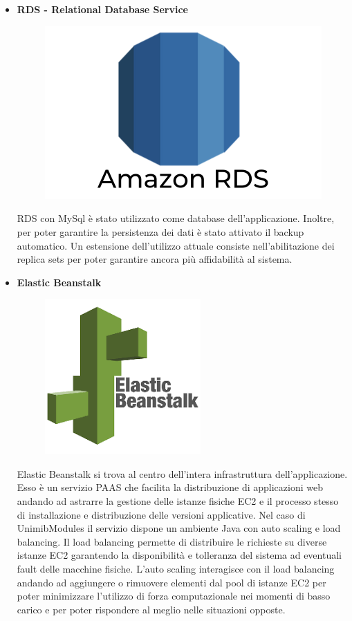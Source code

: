 \documentclass[12pt]{article}
\begin{document}
\begin{itemize}
\item \textbf{RDS - Relational Database Service}
\begin{figure}[H]
\includegraphics[scale=0.1, left]{rds.png}
\end{figure}
RDS con MySql è stato utilizzato come database dell'applicazione. Inoltre, per poter garantire la persistenza dei dati è stato attivato il backup automatico. Un estensione dell'utilizzo attuale consiste nell'abilitazione dei replica sets per poter garantire ancora più affidabilità al sistema.
\item \textbf{Elastic Beanstalk}
\begin{figure}[H]
\includegraphics[scale=0.3, left]{elastic.png}
\end{figure}
Elastic Beanstalk si trova al centro dell'intera infrastruttura dell'applicazione. Esso è un servizio PAAS che facilita la distribuzione di applicazioni web andando ad astrarre la gestione delle istanze fisiche EC2 e il processo stesso di installazione e distribuzione delle versioni applicative. Nel caso di UnimibModules il servizio dispone  un ambiente Java con auto scaling e load balancing. Il load balancing permette di distribuire le richieste su diverse istanze EC2 garantendo la disponibilità  e tolleranza del sistema ad eventuali fault delle macchine fisiche. L'auto scaling interagisce con il load balancing andando ad aggiungere o rimuovere elementi dal pool di istanze EC2 per poter minimizzare l'utilizzo di forza computazionale nei momenti di basso carico  e per poter rispondere al meglio nelle situazioni opposte.

\end{itemize}
\end{document}
